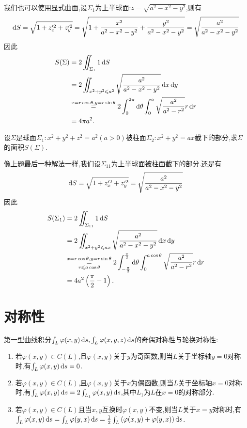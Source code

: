 \begin{solution}
    我们也可以使用显式曲面,设$\Sigma_1$为上半球面:$z=\sqrt{a^2 - x^2 - y^2}$,则有
    $$\operatorname{d\!} S = \sqrt{1 + z_x'^2 + z_y'^2} = \sqrt{1 + \frac{x^2}{a^2 - x^2 - y^2} + \frac{y^2}{a^2 - x^2 - y^2}} = \sqrt{\frac{a^2}{a^2 - x^2 - y^2}}$$
    因此
    \begin{align*}
        S(\Sigma) &= 2 \iint_{\Sigma_1} 1 \operatorname{d\!} S\\
        &= 2 \iint_{x^2 + y^2 \leqslant a^2} \sqrt{\frac{a^2}{a^2 - x^2 - y^2}} \operatorname{d\!} x \operatorname{d\!} y\\
        &\overset{x = r \cos \theta,y = r \sin \theta}{=} 2 \int_0^{2\pi} \operatorname{d\!} \theta \int_0^a \sqrt{\frac{a^2}{a^2 - r^2}} r \operatorname{d\!} r\\
        &= 4 \pi a^2.
    \end{align*}
\end{solution}

\begin{example}
    设$\Sigma$是球面$\Sigma_1: x^2 + y^2 + z^2 = a^2(a > 0)$被柱面$\Sigma_2: x^2 + y^2 = ax$截下的部分,求$\Sigma$的面积$S(\Sigma)$.
\end{example}

\begin{solution}
    像上题最后一种解法一样,我们设$\Sigma_{11}$为上半球面被柱面截下的部分.还是有
    $$\operatorname{d\!} S = \sqrt{1 + z_x'^2 + z_y'^2} = \sqrt{\frac{a^2}{a^2 - x^2 - y^2}}$$
    因此\begin{align*}
        S(\Sigma_1) &= 2 \iint_{\Sigma_{11}} 1 \dif S\\
        &= 2 \iint_{x^2 + y^2 \les ax} \sqrt{\frac{a^2}{a^2 - x^2 - y^2}} \dif x \dif y\\
        &\overunderset{x = r \cos \theta, y = r \sin \theta}{r \les a \cos \theta}{=} 2\int_{-\frac{\pi}{2}}^{\frac{\pi}{2}} \dif \theta \int_0^{a \cos \theta} \sqrt{\frac{a^2}{a^2 - r^2}} r \dif r\\
        &= 4a^2 \left( \frac{\pi}{2} - 1 \right).
    \end{align*}
\end{solution}


\section{对称性}

第一型曲线积分$\int_L \varphi(x,y) \operatorname{d\!} s, \int_L \varphi(x,y,z) \operatorname{d\!} s$的奇偶对称性与轮换对称性:
\begin{enumerate}
    \item 若$\varphi(x,y) \in C(L)$,且$\varphi(x,y)$关于$y$为奇函数,则当$L$关于坐标轴$y=0$对称时,有$\int_L \varphi(x,y) \operatorname{d\!} s = 0$.
    \item 若$\varphi(x,y) \in C(L)$,且$\varphi(x,y)$关于$x$为偶函数,则当$L$关于坐标轴$x=0$对称时,有$\int_L \varphi(x,y) \operatorname{d\!} s = 2 \int_{L_1} \varphi(x,y) \operatorname{d\!} s$,其中$L_1$为$L$在$x=0$的对称部分.
    \item 若$\varphi(x,y) \in C(L)$且当$x,y$互换时$\varphi(x,y)$不变,则当$L$关于$x=y$对称时,有$\int_L \varphi(x,y) \operatorname{d\!} s = \int_L \varphi(y,x) \operatorname{d\!} s = \frac{1}{2} \int_L \left( \varphi(x,y) + \varphi(y,x) \right) \operatorname{d\!} s$.
\end{enumerate}

